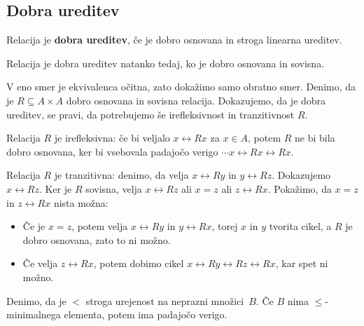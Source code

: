 \subsection{Dobra ureditev}

\begin{definicija}
  Relacija je \textbf{dobra ureditev}, če je dobro osnovana in stroga linearna ureditev.
\end{definicija}

\begin{izrek}
  Relacija je dobra ureditev natanko tedaj, ko je dobro osnovana in sovisna.
\end{izrek}

\begin{dokaz}
  V eno smer je ekvivalenca očitna, zato dokažimo samo obratno smer. Denimo, da je
  $R \subseteq A \times A$ dobro osnovana in sovisna relacija. Dokazujemo, da je dobra ureditev, se pravi,
  da potrebujemo še irefleksivnost in tranzitivnost $R$.

  Relacija $R$ je irefleksivna: če bi veljalo $x \rel{R} x$ za $x \in A$, potem $R$ ne bi bila dobro
  osnovana, ker bi vsebovala padajočo verigo $\cdots x \rel{R} x \rel{R} x$.

  Relacija $R$ je tranzitivna: denimo, da velja $x \rel{R} y$ in $y \rel{R} z$. Dokazujemo $x \rel{R} z$. Ker je $R$
  sovisna, velja $x \rel{R} z$ ali $x = z$ ali $z \rel{R} x$. Pokažimo, da $x = z$ in $z \rel{R} x$ nista
  možna:
  \begin{itemize}
  \item Če je $x = z$, potem velja $x \rel{R} y$ in $y \rel{R} x$, torej $x$ in $y$ tvorita cikel, a
    $R$ je dobro osnovana, zato to ni možno.
  \item Če velja $z \rel{R} x$, potem dobimo cikel $x \rel{R} y \rel{R} z \rel{R} x$, kar spet ni možno.
  \end{itemize}
\end{dokaz}

\begin{lema}
  \label{lem:nepr-min-veriga}%
  Denimo, da je $<$ stroga urejenost na neprazni množici~$B$. Če $B$ nima
  $\leq$-minimalnega elementa, potem ima padajočo verigo.
\end{lema}

